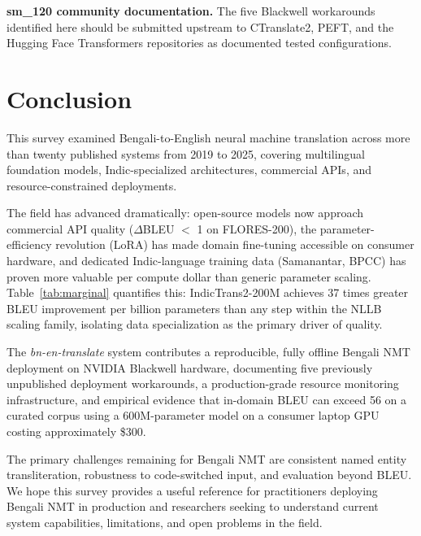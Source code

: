 \documentclass[conference]{IEEEtran}
\begin{document}
\textbf{sm\_120 community documentation.}
The five Blackwell workarounds identified here should be submitted
upstream to CTranslate2, PEFT, and the Hugging Face Transformers
repositories as documented tested configurations.

\section{Conclusion}
\label{sec:conclusion}

This survey examined Bengali-to-English neural machine translation across
more than twenty published systems from 2019 to 2025, covering multilingual
foundation models, Indic-specialized architectures, commercial APIs, and
resource-constrained deployments.

The field has advanced dramatically: open-source models now approach
commercial API quality ($\Delta$BLEU $<$ 1 on FLORES-200), the
parameter-efficiency revolution (LoRA) has made domain fine-tuning
accessible on consumer hardware, and dedicated Indic-language training
data (Samanantar, BPCC) has proven more valuable per compute dollar than
generic parameter scaling.
Table~\ref{tab:marginal} quantifies this: IndicTrans2-200M achieves
37 times greater BLEU improvement per billion parameters than any step
within the NLLB scaling family, isolating data specialization as the
primary driver of quality.

The \textit{bn-en-translate} system contributes a reproducible,
fully offline Bengali NMT deployment on NVIDIA Blackwell hardware,
documenting five previously unpublished deployment workarounds, a
production-grade resource monitoring infrastructure, and empirical
evidence that in-domain BLEU can exceed 56 on a curated corpus using
a 600M-parameter model on a consumer laptop GPU costing approximately
\$300.

The primary challenges remaining for Bengali NMT are consistent named
entity transliteration, robustness to code-switched input, and evaluation
beyond BLEU.
We hope this survey provides a useful reference for practitioners deploying
Bengali NMT in production and researchers seeking to understand current
system capabilities, limitations, and open problems in the field.


\end{document}
